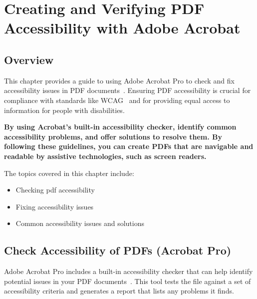 \chapter{Creating and Verifying PDF Accessibility with Adobe Acrobat}
\label{cha:creating-and-verifying-pdf-accessibility-with-adobe-acrobat}

\section{Overview}
\label{sec:overview-16}

This chapter provides a guide to using Adobe Acrobat Pro to check and fix accessibility issues in PDF documents~\supercite{AdobeAccessGuide, AdobeHelpX}. Ensuring PDF accessibility is crucial for compliance with standards like WCAG~\supercite{WCAG21, WCAG22} and for providing equal access to information for people with disabilities.

\textbf{By using Acrobat's built-in accessibility checker, identify common accessibility problems, and offer solutions to resolve them. By following these guidelines, you can create PDFs that are navigable and readable by assistive technologies, such as screen readers.}

The topics covered in this chapter include:

\begin{itemize}
	\item Checking \gls{pdf} \gls{accessibility}
	\item Fixing accessibility issues
	\item Common accessibility issues and solutions
\end{itemize}

\section{Check Accessibility of PDFs (Acrobat Pro)}
\label{sec:check-accessibility-of-pdfs-acrobat-pro}

Adobe Acrobat Pro includes a built-in accessibility checker that can help identify potential issues in your PDF documents~\supercite{AdobeAccessGuide}. This tool tests the file against a set of accessibility criteria and generates a report that lists any problems it finds.

